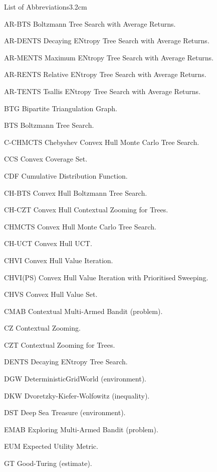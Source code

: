 \begin{mclistof}{List of Abbreviations}{3.2cm}
    \item[AR-BTS] Boltzmann Tree Search with Average Returns.
    \item[AR-DENTS] Decaying ENtropy Tree Search with Average Returns.
    \item[AR-MENTS] Maximum ENtropy Tree Search with Average Returns.
    \item[AR-RENTS] Relative ENtropy Tree Search with Average Returns.
    \item[AR-TENTS] Tsallis ENtropy Tree Search with Average Returns.
    \item[BTG] Bipartite Triangulation Graph.
    \item[BTS] Boltzmann Tree Search.
    \item[C-CHMCTS] Chebyshev Convex Hull Monte Carlo Tree Search.
    \item[CCS] Convex Coverage Set.
    \item[CDF] Cumulative Distribution Function.
    \item[CH-BTS] Convex Hull Boltzmann Tree Search.
    \item[CH-CZT] Convex Hull Contextual Zooming for Trees.
    \item[CHMCTS] Convex Hull Monte Carlo Tree Search.
    \item[CH-UCT] Convex Hull UCT.
    \item[CHVI] Convex Hull Value Iteration.
    \item[CHVI(PS)] Convex Hull Value Iteration with Prioritised Sweeping.
    \item[CHVS] Convex Hull Value Set.
    \item[CMAB] Contextual Multi-Armed Bandit (problem).
    \item[CZ] Contextual Zooming. 
    \item[CZT] Contextual Zooming for Trees.
    \item[DENTS] Decaying ENtropy Tree Search.
    \item[DGW] DeterministicGridWorld (environment).
    \item[DKW] Dvoretzky-Kiefer-Wolfowitz (inequality).
    \item[DST] Deep Sea Treasure (environment). 
    \item[EMAB] Exploring Multi-Armed Bandit (problem).    
    \item[EUM] Expected Utility Metric.
    \item[GT] Good-Turing (estimate).

\end{mclistof}
